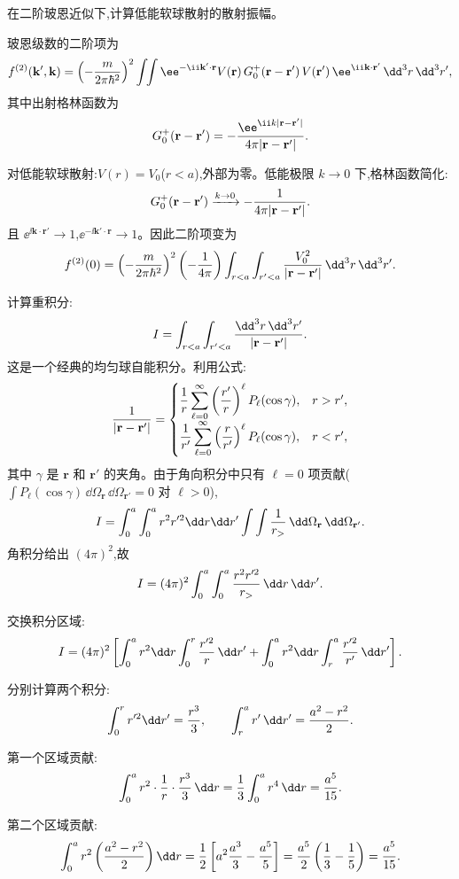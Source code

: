 \begin{question}
在二阶玻恩近似下,计算低能软球散射的散射振幅。
\begin{solution}
玻恩级数的二阶项为
\[
f^{(2)}(\mathbf k',\mathbf k)=\left(-{m\over2\pi\hbar^2}\right)^2
\int\!\!\int \ee^{-\ii\mathbf k'\cdot\mathbf r}
V(\mathbf r)\,G_0^+(\mathbf r-\mathbf r')\,V(\mathbf r')\,\ee^{\ii\mathbf k\cdot\mathbf r'}\,\dd^3r\,\dd^3r',
\]
其中出射格林函数为
\[
G_0^+(\mathbf r-\mathbf r')=-{\ee^{\ii k|\mathbf r-\mathbf r'|}\over4\pi|\mathbf r-\mathbf r'|}.
\]

对低能软球散射:$V(r)=V_0$($r<a$),外部为零。低能极限 $k\to0$ 下,格林函数简化:
\[
G_0^+(\mathbf r-\mathbf r')\xrightarrow{k\to0}-{1\over4\pi|\mathbf r-\mathbf r'|}.
\]
且 $\ee^{\ii\mathbf k\cdot\mathbf r'}\to1$,$\ee^{-\ii\mathbf k'\cdot\mathbf r}\to1$。因此二阶项变为
\[
f^{(2)}(0)=\left(-{m\over2\pi\hbar^2}\right)^2\left(-{1\over4\pi}\right)
\int_{r<a}\int_{r'<a}{V_0^2\over|\mathbf r-\mathbf r'|}\,\dd^3r\,\dd^3r'.
\]

计算重积分:
\[
I=\int_{r<a}\int_{r'<a}{\dd^3r\,\dd^3r'\over|\mathbf r-\mathbf r'|}.
\]
这是一个经典的均匀球自能积分。利用公式:
\[
{1\over|\mathbf r-\mathbf r'|}=
\begin{cases}
\displaystyle{1\over r}\sum_{\ell=0}^{\infty}\left({r'\over r}\right)^\ell P_\ell(\cos\gamma), & r>r',\\[8pt]
\displaystyle{1\over r'}\sum_{\ell=0}^{\infty}\left({r\over r'}\right)^\ell P_\ell(\cos\gamma), & r<r',
\end{cases}
\]
其中 $\gamma$ 是 $\mathbf r$ 和 $\mathbf r'$ 的夹角。由于角向积分中只有 $\ell=0$ 项贡献($\int P_\ell(\cos\gamma)\,\dd\Omega_{\mathbf r}\,\dd\Omega_{\mathbf r'}=0$ 对 $\ell>0$),
\[
I=\int_0^a\int_0^a r^2r'^2\dd r\dd r'\int\int{1\over r_>}\,\dd\Omega_{\mathbf r}\,\dd\Omega_{\mathbf r'}.
\]
角积分给出 $(4\pi)^2$,故
\[
I=(4\pi)^2\int_0^a\int_0^a{r^2r'^2\over r_>}\,\dd r\,\dd r'.
\]

交换积分区域:
\[
I=(4\pi)^2\left[\int_0^a r^2\dd r\int_0^r{r'^2\over r}\,\dd r'
+\int_0^a r^2\dd r\int_r^a{r'^2\over r'}\,\dd r'\right].
\]

分别计算两个积分:
\[
\int_0^r r'^2\dd r'={r^3\over3},\qquad
\int_r^a r'\,\dd r'={a^2-r^2\over2}.
\]

第一个区域贡献:
\[
\int_0^a r^2\cdot{1\over r}\cdot{r^3\over3}\,\dd r={1\over3}\int_0^a r^4\,\dd r={a^5\over15}.
\]

第二个区域贡献:
\[
\int_0^a r^2\left({a^2-r^2\over2}\right)\dd r
={1\over2}\left[a^2{a^3\over3}-{a^5\over5}\right]
={a^5\over2}\left({1\over3}-{1\over5}\right)={a^5\over15}.
\]


\end{solution}
\end{question}
